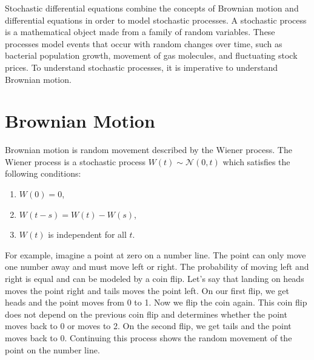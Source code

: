 \label{lab:sde}

Stochastic differential equations combine the concepts of Brownian motion and differential equations in order to model stochastic processes.
A stochastic process is a mathematical object made from a family of random variables.
These processes model events that occur with random changes over time, such as bacterial population growth, movement of gas molecules, and fluctuating stock prices.
To understand stochastic processes, it is imperative to understand Brownian motion.

\section*{Brownian Motion}

Brownian motion is random movement described by the Wiener process.
The Wiener process is a stochastic process $W(t)\sim\mathscr{N}(0,t)$ which satisfies the following conditions:

\begin{enumerate}
\item $W(0)=0$,\\
\item $W(t-s)=W(t) - W(s)$,\\
\item $W(t)$ is independent for all $t$.
\end{enumerate}

For example, imagine a point at zero on a number line.
The point can only move one number away and must move left or right.
The probability of moving left and right is equal and can be modeled by a coin flip.
Let's say that landing on heads moves the point right and tails moves the point left.
On our first flip, we get heads and the point moves from 0 to 1.
Now we flip the coin again.
This coin flip does not depend on the previous coin flip and determines whether the point moves back to 0 or moves to 2.
On the second flip, we get tails and the point moves back to 0.
Continuing this process shows the random movement of the point on the number line.


